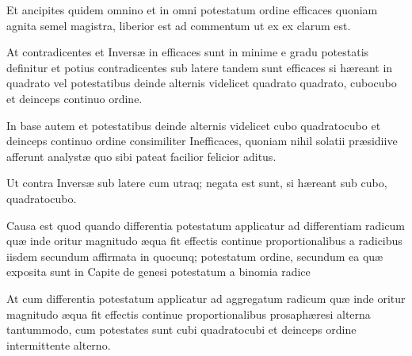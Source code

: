 \documentclass[11pt,a4paper]{article}
\begin{document}
Et ancipites quidem  omnino et in omni potestatum ordine efficaces quoniam agnita semel magistra, liberior est ad commentum  ut ex ex  clarum est.

At contradicentes et Inversæ in  efficaces sunt in  minime  e gradu potestatis definitur et potius contradicentes sub latere tandem sunt efficaces si hæreant in quadrato vel potestatibus deinde alternis videlicet quadrato quadrato, cubocubo et deinceps continuo ordine.

In base autem et potestatibus deinde alternis videlicet cubo quadratocubo et deinceps continuo ordine consimiliter   Inefficaces, quoniam nihil solatii præsidiive afferunt analystæ quo sibi pateat \ill{} facilior felicior aditus.

Ut contra Inversæ sub latere cum utraq; negata est  sunt, si hæreant sub cubo, quadratocubo.

Causa est quod quando differentia potestatum applicatur ad differentiam radicum quæ inde oritur magnitudo æqua fit effectis continue proportionalibus a radicibus iisdem secundum affirmata in quocunq; potestatum ordine, secundum ea quæ exposita sunt in Capite de genesi potestatum a binomia radice

At cum differentia potestatum applicatur ad aggregatum radicum quæ inde oritur magnitudo æqua fit effectis continue proportionalibus prosaphæresi alterna tantummodo, cum potestates sunt cubi quadratocubi et deinceps ordine intermittente alterno.
\end{document}

